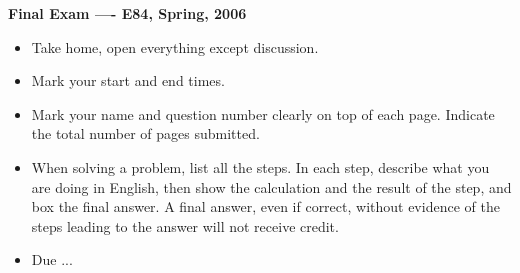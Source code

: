 \usepackage{html}

\begin{center}
{\Large \bf  Final Exam ---- E84, Spring, 2006}
\end{center}

\begin{itemize}
\item Take home, open everything except discussion.
\item Mark your start and end times. %
\item Mark your name and question number clearly on top of each page.
	Indicate the total number of pages submitted.
\item When solving a problem, list all the steps. In each step, describe 
	what you are doing in English, then show the calculation and the 
	result of the step, and box the final answer. A final answer, 
	even if correct, without evidence of the steps leading to the 
	answer will not receive credit.
\item Due ...
\end{itemize}

